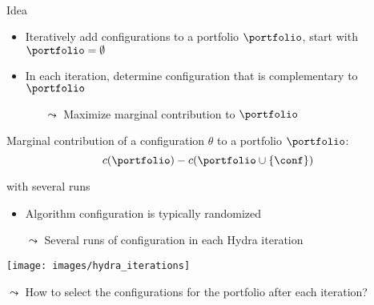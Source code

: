 \begin{frame}[c]{\hydra~}

\begin{block}{Idea}
\begin{itemize}
  \item Iteratively add configurations to a portfolio $\portfolio$, start with $\portfolio = \emptyset$
  \item In each iteration, determine configuration that is complementary to~$\portfolio$
  \begin{itemize}
    \item[$\leadsto$] Maximize marginal contribution to $\portfolio$
  \end{itemize}
\end{itemize}

\pause

Marginal contribution of a configuration $\theta$ to a portfolio $\portfolio$:
\begin{equation}
c(\portfolio) -  c(\portfolio \cup \{\conf\})  \nonumber
\end{equation}

\end{block}

\pause

\scalebox{0.8}{
\centering

}

\end{frame}

\begin{frame}[c]{\hydra{} with several runs}

\begin{itemize}
  \item Algorithm configuration is typically randomized
  \item[$\leadsto$] Several runs of configuration in each Hydra iteration
\end{itemize}

\texttt{[image: images/hydra\_iterations]}

\pause

\medskip
$\leadsto$ How to select the configurations for the portfolio after each iteration?

\end{frame}
